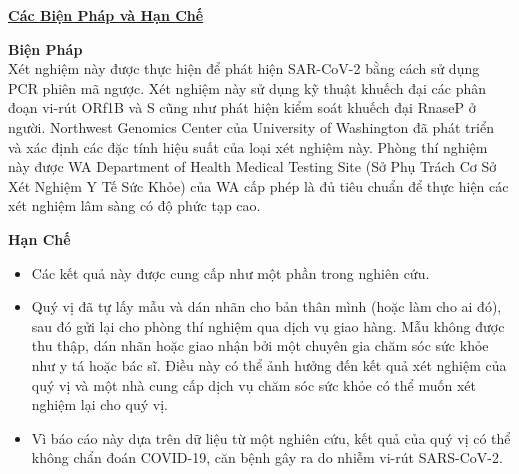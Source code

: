 \documentclass[10pt]{article}
\begin{document}
\bigskip

\large \underline{\textbf{Các Biện Pháp và Hạn Chế}}

\textbf{Biện Pháp}\\
Xét nghiệm này được thực hiện để phát hiện SAR-CoV-2 bằng cách sử dụng PCR phiên
mã ngược. Xét nghiệm này sử dụng kỹ thuật khuếch đại các phân đoạn vi-rút ORf1B
và S cũng như phát hiện kiểm soát khuếch đại RnaseP ở người. Northwest Genomics
Center của University of Washington đã phát triển và xác định các đặc tính hiệu
suất của loại xét nghiệm này. Phòng thí nghiệm này được WA Department of Health
Medical Testing Site (Sở Phụ Trách Cơ Sở Xét Nghiệm Y Tế Sức Khỏe) của WA cấp
phép là đủ tiêu chuẩn để thực hiện các xét nghiệm lâm sàng có độ phức tạp cao.

\textbf{Hạn Chế}

\begin{itemize}

\item

  Các kết quả này được cung cấp như một phần trong nghiên cứu.

\item

  Quý vị đã tự lấy mẫu và dán nhãn cho bản thân mình (hoặc làm cho ai đó), sau
  đó gửi lại cho phòng thí nghiệm qua dịch vụ giao hàng. Mẫu không được thu
  thập, dán nhãn hoặc giao nhận bởi một chuyên gia chăm sóc sức khỏe như y tá
  hoặc bác sĩ. Điều này có thể ảnh hưởng đến kết quả xét nghiệm của quý vị và
  một nhà cung cấp dịch vụ chăm sóc sức khỏe có thể muốn xét nghiệm lại cho quý
  vị.

\item

  Vì báo cáo này dựa trên dữ liệu từ một nghiên cứu, kết quả của quý vị có thể
  không chẩn đoán COVID-19, căn bệnh gây ra do nhiễm vi-rút SARS-CoV-2.

\end{itemize}
\end{document}
